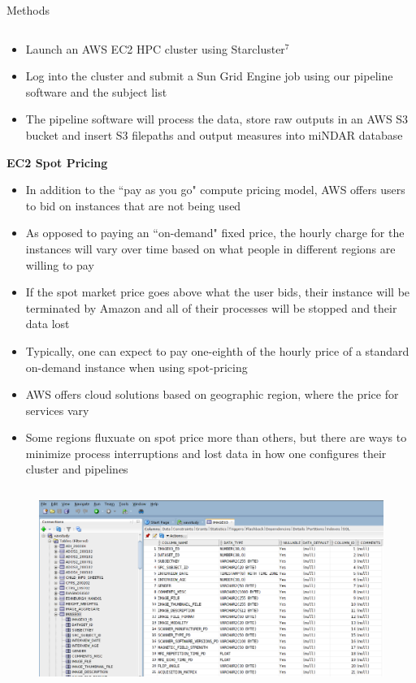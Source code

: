 \documentclass[final,hyperref={pdfpagelabels=false}]{beamer}
\begin{document}
\begin{frame}
\begin{columns}
\begin{column}{.5\textwidth}
{\begin{block}{Methods}
\begin{column}{.47\textwidth}
\begin{itemize}
                    \item Launch an AWS EC2 HPC cluster using Starcluster$^{7}$
                    \item Log into the cluster and submit a Sun Grid Engine job using our pipeline software and the subject list
                    \item The pipeline software will process the data, store raw outputs in an AWS S3 bucket and insert S3 filepaths and output measures into miNDAR database
                \end{itemize}
              {\bf EC2 Spot Pricing}
              \begin{itemize}
                  \item In addition to the ``pay as you go" compute pricing model, AWS offers users to bid on instances that are not being used
                  \item As opposed to paying an ``on-demand" fixed price, the hourly charge for the instances will vary over time based on what people in different regions are willing to pay
                  \item If the spot market price goes above what the user bids, their instance will be terminated by Amazon and all of their processes will be stopped and their data lost
                  \item Typically, one can expect to pay one-eighth of the hourly price of a standard on-demand instance when using spot-pricing
                  \item AWS offers cloud solutions based on geographic region, where the price for services vary
                  \item Some regions fluxuate on spot price more than others, but there are ways to minimize process interruptions and lost data in how one configures their cluster and pipelines
              \end{itemize}
            \end{column}
            \begin{column}{.47\textwidth}
                \begin{figure}
                    \begin{center}
                        \includegraphics[width=.9\textwidth]{mindar.png}

\end{center}
\end{figure}
\end{column}
\end{block}}
\end{column}
\end{columns}
\end{frame}
\end{document}
